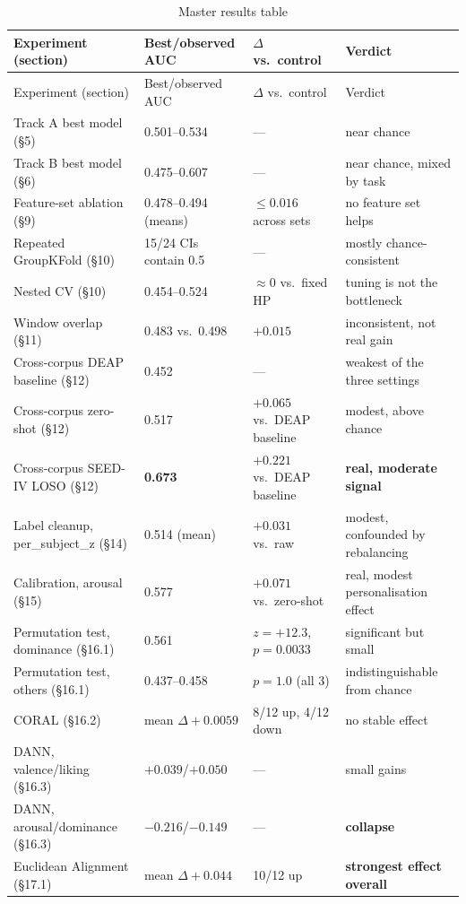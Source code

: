 \documentclass[11pt]{report}
\begin{document}
\begin{longtable}{p{5.5cm}p{2.3cm}p{2.1cm}p{4.3cm}}
\caption{Master results table} \label{tab:master} \\
\toprule
Experiment (section) & Best/observed AUC & $\Delta$ vs.\ control & Verdict \\
\midrule
\endfirsthead
\toprule
Experiment (section) & Best/observed AUC & $\Delta$ vs.\ control & Verdict \\
\midrule
\endhead
Track A best model (\S5) & 0.501--0.534 & --- & near chance \\
Track B best model (\S6) & 0.475--0.607 & --- & near chance, mixed by task \\
Feature-set ablation (\S9) & 0.478--0.494 (means) & $\le0.016$ across sets & no feature set helps \\
Repeated GroupKFold (\S10) & 15/24 CIs contain 0.5 & --- & mostly chance-consistent \\
Nested CV (\S10) & 0.454--0.524 & $\approx0$ vs.\ fixed HP & tuning is not the bottleneck \\
Window overlap (\S11) & 0.483 vs.\ 0.498 & $+0.015$ & inconsistent, not real gain \\
Cross-corpus DEAP baseline (\S12) & 0.452 & --- & weakest of the three settings \\
Cross-corpus zero-shot (\S12) & 0.517 & $+0.065$ vs.\ DEAP baseline & modest, above chance \\
Cross-corpus SEED-IV LOSO (\S12) & \textbf{0.673} & $+0.221$ vs.\ DEAP baseline & \textbf{real, moderate signal} \\
Label cleanup, per\_subject\_z (\S14) & 0.514 (mean) & $+0.031$ vs.\ raw & modest, confounded by rebalancing \\
Calibration, arousal (\S15) & 0.577 & $+0.071$ vs.\ zero-shot & real, modest personalisation effect \\
Permutation test, dominance (\S16.1) & 0.561 & $z=+12.3$, $p=0.0033$ & significant but small \\
Permutation test, others (\S16.1) & 0.437--0.458 & $p=1.0$ (all 3) & indistinguishable from chance \\
CORAL (\S16.2) & mean $\Delta+0.0059$ & 8/12 up, 4/12 down & no stable effect \\
DANN, valence/liking (\S16.3) & $+0.039$/$+0.050$ & --- & small gains \\
DANN, arousal/dominance (\S16.3) & $-0.216$/$-0.149$ & --- & \textbf{collapse} \\
Euclidean Alignment (\S17.1) & mean $\Delta+0.044$ & 10/12 up & \textbf{strongest effect overall} \\

\end{longtable}
\end{document}
